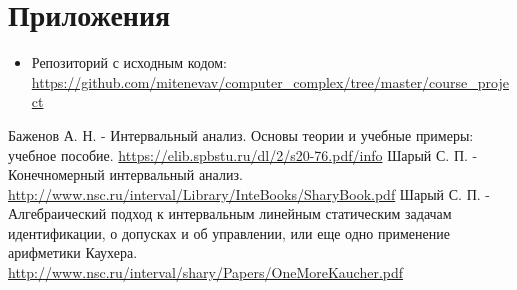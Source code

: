\documentclass{article}
\begin{document}
     
    
\newpage

\section{Приложения}
    \begin{itemize}
        \item Репозиторий с исходным кодом: \url{https://github.com/mitenevav/computer_complex/tree/master/course_project}
    \end{itemize}
   
\vspace{4cm} 
    
 
\begin{thebibliography}{}
      Баженов А. Н.  -  Интервальный анализ. Основы теории и учебные примеры: учебное пособие.  \url{https://elib.spbstu.ru/dl/2/s20-76.pdf/info}
      Шарый С. П.  -  Конечномерный интервальный анализ.
    \url{http://www.nsc.ru/interval/Library/InteBooks/SharyBook.pdf}
      Шарый С. П.  -  Алгебраический подход к интервальным линейным статическим задачам идентификации, о допусках и об управлении, или еще одно применение арифметики Каухера.
    \url{http://www.nsc.ru/interval/shary/Papers/OneMoreKaucher.pdf}
\end{thebibliography}
\end{document}
